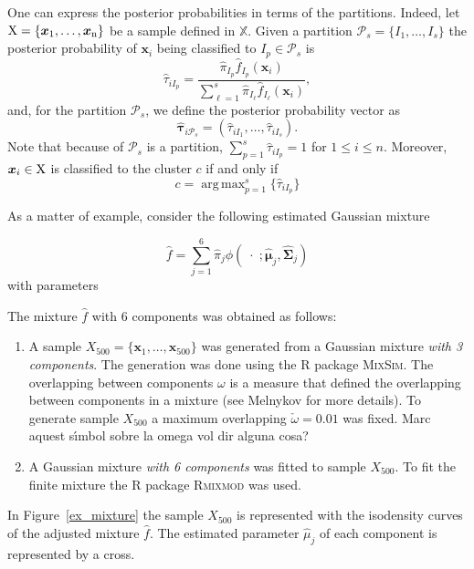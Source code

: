 \documentclass[10pt, a4paper]{article}
\DeclareMathOperator*{\argmax}{arg\,max}
\newcommand{\m}[1]{\boldsymbol{#1}}
\begin{document}
\begin{spacing}{1.9}
One can express the posterior probabilities in terms of the partitions. Indeed, let $\rm X = \{\m x_1,\dots, \m x_n\}$ be a sample defined in $\mathbb{X}$. Given a partition $\mathcal{P}_s = \{ I_1, \dots, I_s \}$ the posterior probability of $\m x_i$ being classified to $I_p\in \mathcal{P}_{s}$ is
\[
\hat{\tau}_{i I_p} =  \frac{ \hat{\pi}_{I_p} \hat{f}_{I_p}(\m x_i) }{\sum_{\ell=1}^s \hat{\pi}_{I_\ell} \hat{f}_{I_\ell}(\m x_i)},
\]
and, for the partition  $\mathcal{P}_s$, we define the posterior probability vector as
\[
\hat{\m\tau}_{i \mathcal{P}_s} = \left( \hat{\tau}_{i I_1} , \dots, \hat{\tau}_{i I_s}  \right).
\]
Note that because of $\mathcal{P}_s$ is a partition, $\sum_{p=1}^s \hat{\tau}_{i I_p} = 1$ for $1 \leq i \leq n$.
Moreover, $\m x_i \in \rm X$ is classified to the cluster $c$ if and only if
\begin{equation}\label{cluster_criteria}
c= \argmax_{p=1}^s \{ \hat{\tau}_{i I_p} \}
\end{equation}


As a matter of example, consider the following estimated Gaussian mixture

\[
\hat{f} = \sum_{j=1}^6 \hat{\pi}_j \phi(\;\cdot\; ; \hat{\m\mu}_j, \hat{\m\Sigma}_j)
\]
with parameters
{\small

}

The mixture $\hat{f}$ with $6$ components was obtained as follows:
\begin{enumerate}
\item A sample  $X_{500}=\{\m x_1, \dots, \m x_{500}\}$ was generated from a Gaussian mixture \emph{with 3 components}. The generation was done using the R package \textsc{MixSim}. The overlapping between components $\omega$ is a measure that defined the overlapping between components in a mixture (see Melnykov for more details). To generate sample $X_{500}$ a maximum overlapping $\check{\omega} = 0.01$ was fixed. {\color{blue} Marc aquest s\'{\i}mbol sobre la omega vol dir alguna cosa?}
\item A Gaussian mixture \emph{with 6 components} was fitted to sample $X_{500}$. To fit the finite mixture the R package \textsc{Rmixmod} was used.
\end{enumerate}
In Figure~\ref{ex_mixture} the sample $X_{500}$ is represented with the isodensity curves of the adjusted mixture $\hat{f}$. The estimated parameter $\hat{\mu}_j$ of each component is represented by a cross.


\end{spacing}
\end{document}
